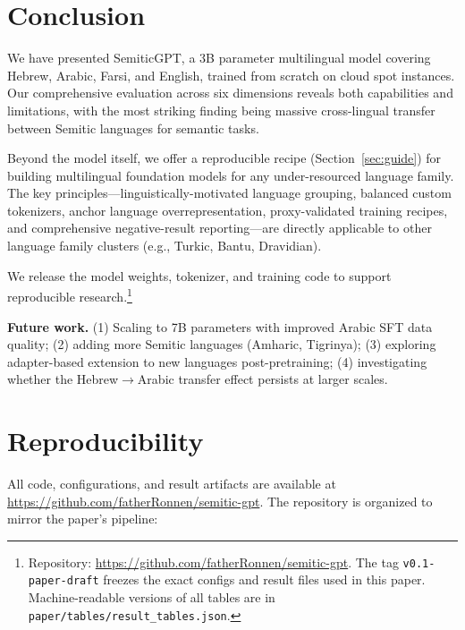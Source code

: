 \documentclass[10pt,twocolumn]{article}
\begin{document}
\section{Conclusion}

We have presented SemiticGPT, a 3B parameter multilingual model covering Hebrew, Arabic, Farsi, and English, trained from scratch on cloud spot instances. Our comprehensive evaluation across six dimensions reveals both capabilities and limitations, with the most striking finding being massive cross-lingual transfer between Semitic languages for semantic tasks.

Beyond the model itself, we offer a reproducible recipe (Section~\ref{sec:guide}) for building multilingual foundation models for any under-resourced language family. The key principles---linguistically-motivated language grouping, balanced custom tokenizers, anchor language overrepresentation, proxy-validated training recipes, and comprehensive negative-result reporting---are directly applicable to other language family clusters (e.g., Turkic, Bantu, Dravidian).

We release the model weights, tokenizer, and training code to support reproducible research.\footnote{Repository: \url{https://github.com/fatherRonnen/semitic-gpt}. The tag \texttt{v0.1-paper-draft} freezes the exact configs and result files used in this paper. Machine-readable versions of all tables are in \texttt{paper/tables/result\_tables.json}.}

\textbf{Future work.} (1) Scaling to 7B parameters with improved Arabic SFT data quality; (2) adding more Semitic languages (Amharic, Tigrinya); (3) exploring adapter-based extension to new languages post-pretraining; (4) investigating whether the Hebrew$\rightarrow$Arabic transfer effect persists at larger scales.

\section{Reproducibility}

All code, configurations, and result artifacts are available at \url{https://github.com/fatherRonnen/semitic-gpt}. The repository is organized to mirror the paper's pipeline:
\end{document}

